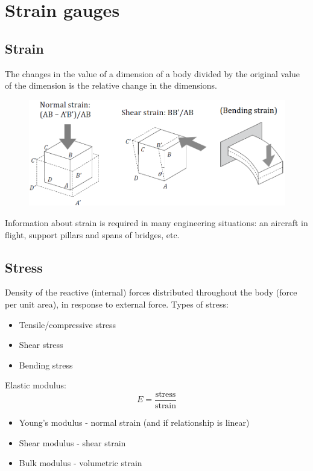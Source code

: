 \documentclass[class=report, crop=false, 12pt,a4paper, tikz, border=4mm]{standalone}
\begin{document}
\section{Strain gauges}
\subsection{Strain}
The changes in the value of a dimension of a body divided by the original value of the dimension is the relative change in the dimensions. 
\begin{figure}[H]
  \centering
  \includegraphics[width = 0.8 \textwidth]{../img/diagram8.png}
\end{figure}
Information about strain is required in many engineering situations: an aircraft in flight, support pillars and spans of bridges, etc.
\subsection{Stress}
Density of the reactive (internal) forces distributed throughout the body (force per unit area), in response to external force. Types of stress:
\begin{itemize}
  \item Tensile/compressive stress
  \item Shear stress
  \item Bending stress
\end{itemize}
Elastic modulus:
\begin{equation}
  E = \frac{\textrm{stress}}{\textrm{strain}}
\end{equation}
\begin{itemize}
  \item Young's modulus - normal strain (and if relationship is linear)
  \item Shear modulus - shear strain
  \item Bulk modulus - volumetric strain
\end{itemize}
\end{document}
